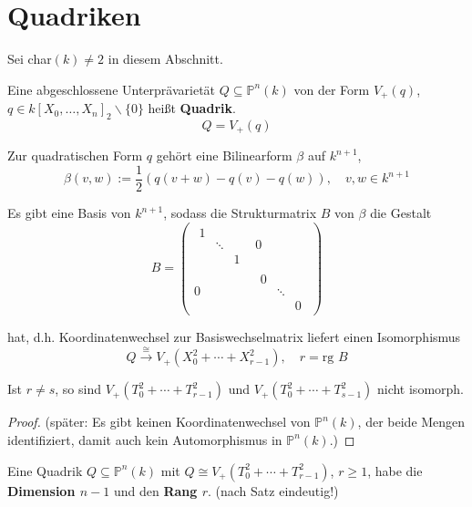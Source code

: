 \section{Quadriken}
\label{sec:quadriken}

Sei char$(k)\neq2$ in diesem Abschnitt.
\begin{defn}[orig. 57]
  \label{def:quadrik}
  Eine abgeschlossene Unterprävarietät $Q\subseteq\mathbb{P}^{n}(k)$
  von der Form $V_{+}(q)$, $q\in k[X_{0},\ldots,X_{n}]_{2}\backslash\{0\}$
  heißt \textbf{Quadrik}.
  \[
    Q=V_{+}(q)
  \]

  Zur quadratischen Form $q$ gehört eine Bilinearform $\beta$ auf
  $k^{n+1}$, 
  \[
    \beta(v,w):=\frac{1}{2}(q(v+w)-q(v)-q(w)),\quad v,w\in k^{n+1}
  \]

Es gibt eine Basis von $k^{n+1}$, sodass die Strukturmatrix $B$
von $\beta$ die Gestalt
\[
  B=\begin{pmatrix}
    \begin{array}{ccc}
      1\\
      & \ddots\\
      &  & 1
    \end{array} & 0\\
    0 &
    \begin{array}{ccc}
      0\\
      & \ddots\\
      &  & 0
    \end{array}
  \end{pmatrix}
\]

hat, d.h. Koordinatenwechsel zur Basiswechselmatrix liefert einen
Isomorphismus
\[
  Q\xrightarrow{\cong}V_{+}(X_{0}^{2}+\cdots+X_{r-1}^{2}),\quad r=\text{rg }B
\]
\end{defn}
\begin{lem}[orig. 58]
  \label{lem:platzhalter}
\end{lem}
\begin{prop}[orig. 59]
  \label{prop:quadrik-in-normalform}
  Ist $r\neq s$, so sind $V_{+}(T_{0}^{2}+\cdots+T_{r-1}^{2})$ und
  $V_{+}(T_{0}^{2}+\cdots+T_{s-1}^{2})$ nicht isomorph.
\end{prop}
\begin{proof}
  (später: Es gibt keinen Koordinatenwechsel von $\mathbb{P}^{n}(k)$,
  der beide Mengen identifiziert, damit auch kein Automorphismus in
  $\mathbb{P}^{n}(k)$.)
\end{proof}

\begin{defn}
  \label{def:dim-und-rang-einer-quadrik}
  Eine Quadrik $Q\subseteq\mathbb{P}^{n}(k)$ mit
  $Q\cong V_{+}(T_{0}^{2}+\cdots+T_{r-1}^{2})$, $r\geq1$, habe die
  \textbf{Dimension $n-1$} und den \textbf{Rang $r$}. (nach Satz
  eindeutig!)
\end{defn}

